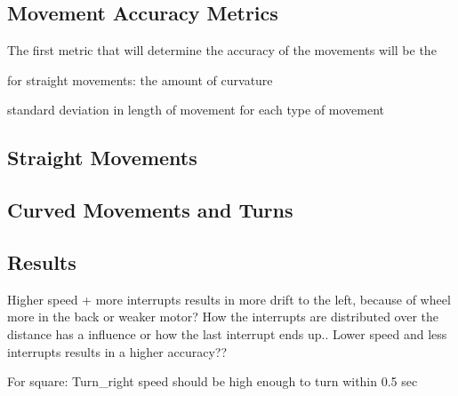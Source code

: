 \subsection{Movement Accuracy Metrics}

The first metric that will determine the accuracy of the movements will be the 


for straight movements: the amount of curvature

standard deviation in length of movement for each type of movement

\subsection{Straight Movements}




\subsection{Curved Movements and Turns}


\subsection{Results}
Higher speed + more interrupts results in more drift to the left, because of wheel more in the back or weaker motor?
How the interrupts are distributed over the distance has a influence or how the last interrupt ends up..
Lower speed and less interrupts results in a higher accuracy??


For square: Turn\_right speed should be high enough to turn within 0.5 sec


